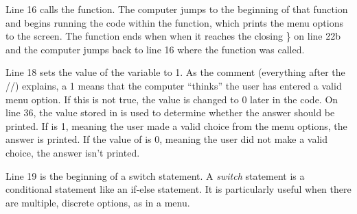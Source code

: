 
Line 16 calls the  function.  The computer jumps to the beginning of that function and begins running the code within the function, which prints the menu options to the screen.  The function ends when when it reaches the closing \} on line 22b and the computer jumps back to line 16 where the function was called.


Line 18 sets the value of the variable  to 1.  As the comment (everything after the //) explains, a 1 means that the computer ``thinks'' the user has entered a valid menu option.  If this is not true, the value is changed to 0 later in the code.  On line 36, the value stored in  is used to determine whether the answer should be printed.  If  is 1, meaning the user made a valid choice from the menu options, the answer is printed.  If the value of  is 0, meaning the user did not make a valid choice, the answer isn't printed.


Line 19 is the beginning of a switch statement.  A \emph{switch} statement is a conditional statement like an if-else statement.  It is particularly useful when there are multiple, discrete options, as in a menu.   

